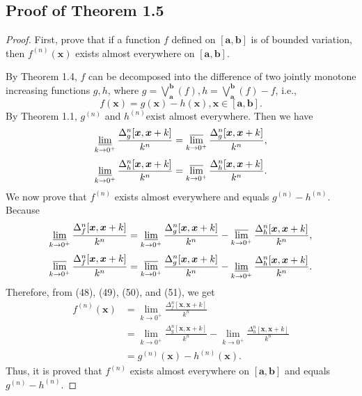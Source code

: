 \documentclass{ijclclp}
\begin{document}
\subsection{Proof of Theorem 1.5}
\begin{proof}
    First, prove that if a function \(f\) defined on \([\boldsymbol{a},\boldsymbol{b}]\) is of bounded variation, then \(f^{(n)}(\boldsymbol{x})\) exists almost everywhere on \([\boldsymbol{a},\boldsymbol{b}]\).

    By Theorem 1.4, \(f\) can be decomposed into the difference of two jointly monotone increasing functions \(g,h\), where \(g=\bigvee\limits_{\boldsymbol{a}}^{\boldsymbol{b}}(f),h=\bigvee\limits_{\boldsymbol{a}}^{\boldsymbol{b}}(f)-f\), i.e.,
    \[f(\boldsymbol{x})=g(\boldsymbol{x})-h(\boldsymbol{x}),\boldsymbol{x}\in[\boldsymbol{a},\boldsymbol{b}].\]
    By Theorem 1.1, \(g^{(n)}\) and \(h^{(n)}\)exist almost everywhere. Then we have
    \begin{equation}
        \varliminf_{k\to0^+}\frac{\Delta_{g}^n[\boldsymbol{x},\boldsymbol{x}+k]}{k^n}=\varlimsup_{k\to0^+}\frac{\Delta_{g}^n[\boldsymbol{x},\boldsymbol{x}+k]}{k^n},
    \end{equation}
    \begin{equation}
        \varliminf_{k\to0^+}\frac{\Delta_{h}^n[\boldsymbol{x},\boldsymbol{x}+k]}{k^n}=\varlimsup_{k\to0^+}\frac{\Delta_{h}^n[\boldsymbol{x},\boldsymbol{x}+k]}{k^n}.
    \end{equation}
    We now prove that \(f^{(n)}\) exists almost everywhere and equals \(g^{(n)}-h^{(n)}\). Because
    \begin{equation}
        \varliminf_{k\to0^+}\frac{\Delta_f^n[\boldsymbol{x},\boldsymbol{x}+k]}{k^n}=\varliminf_{k\to0^+}\frac{\Delta_{g}^n[\boldsymbol{x},\boldsymbol{x}+k]}{k^n}-\varlimsup_{k\to0^+}\frac{\Delta_{h}^n[\boldsymbol{x},\boldsymbol{x}+k]}{k^n},
    \end{equation}        
    \begin{equation}
        \varlimsup_{k\to0^+}\frac{\Delta_f^n[\boldsymbol{x},\boldsymbol{x}+k]}{k^n}=\varlimsup_{k\to0^+}\frac{\Delta_{g}^n[\boldsymbol{x},\boldsymbol{x}+k]}{k^n}-\varliminf_{k\to0^+}\frac{\Delta_{h}^n[\boldsymbol{x},\boldsymbol{x}+k]}{k^n}.
    \end{equation}
    Therefore, from (48), (49), (50), and (51), we get
    \begin{align*}
        f^{(n)}(\boldsymbol{x})&=\lim_{k\to0^+}\frac{\Delta_f^n[\boldsymbol{x},\boldsymbol{x}+k]}{k^n}\\
        &=\lim_{k\to0^+}\frac{\Delta_{g}^n[\boldsymbol{x},\boldsymbol{x}+k]}{k^n}-\lim_{k\to0^+}\frac{\Delta_{h}^n[\boldsymbol{x},\boldsymbol{x}+k]}{k^n}\\
        &=g^{(n)}(\boldsymbol{x})-h^{(n)}(\boldsymbol{x}).
    \end{align*}
    Thus, it is proved that \(f^{(n)}\) exists almost everywhere on \([\boldsymbol{a},\boldsymbol{b}]\) and equals \(g^{(n)}-h^{(n)}\).
    

\end{proof}
\end{document}
